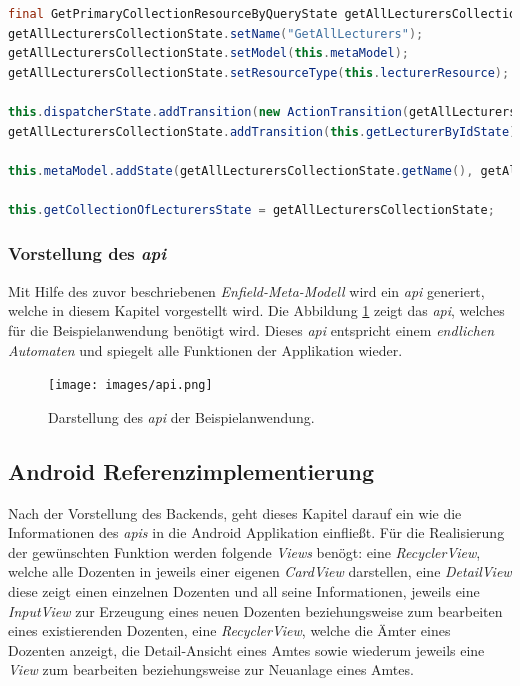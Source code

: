 \begin{lstlisting}[label=lst:getState_impl,
language=java,
firstnumber=1,
caption=Erzeugung des \textit{GetAllLecturers States}. ]
final GetPrimaryCollectionResourceByQueryState getAllLecturersCollectionState = new GetPrimaryCollectionResourceByQueryState();
getAllLecturersCollectionState.setName("GetAllLecturers");
getAllLecturersCollectionState.setModel(this.metaModel);
getAllLecturersCollectionState.setResourceType(this.lecturerResource);

this.dispatcherState.addTransition(new ActionTransition(getAllLecturersCollectionState, "getAllLecturers"));
getAllLecturersCollectionState.addTransition(this.getLecturerByIdState);

this.metaModel.addState(getAllLecturersCollectionState.getName(), getAllLecturersCollectionState);

this.getCollectionOfLecturersState = getAllLecturersCollectionState;
\end{lstlisting}
 
\subsubsection{Vorstellung des \textit{\acf{api}}}
Mit Hilfe des zuvor beschriebenen \textit{Enfield-Meta-Modell} wird ein \textit{\acl{api}} generiert, welche in diesem Kapitel vorgestellt wird.
Die Abbildung \ref{fig:api} zeigt das \textit{\acl{api}}, welches für die Beispielanwendung benötigt wird. Dieses\textit{ \ac{api}} entspricht einem \textit{endlichen Automaten} und spiegelt alle Funktionen der Applikation wieder.  

\begin{figure}[H]
	\begin{center}
		\texttt{[image: images/api.png]}
		\caption{Darstellung des \textit{\ac{api}} der Beispielanwendung.}
		\label{fig:api}
	\end{center}
\end{figure}

\subsection{Android Referenzimplementierung}\label{sec:ref_impl}
Nach der Vorstellung des Backends, geht dieses Kapitel darauf ein wie die Informationen des \textit{\acl{api}s} in die Android Applikation einfließt.
Für die Realisierung der gewünschten Funktion werden folgende \textit{Views} benögt: eine \textit{RecyclerView}, welche alle Dozenten in jeweils einer eigenen \textit{CardView} darstellen, eine \textit{DetailView} diese zeigt einen einzelnen Dozenten und all seine Informationen, jeweils eine \textit{InputView} zur Erzeugung eines neuen Dozenten beziehungsweise zum bearbeiten eines existierenden Dozenten, eine \textit{RecyclerView}, welche die Ämter eines Dozenten anzeigt, die Detail-Ansicht eines Amtes sowie wiederum jeweils eine \textit{View} zum bearbeiten beziehungsweise zur Neuanlage eines Amtes.

